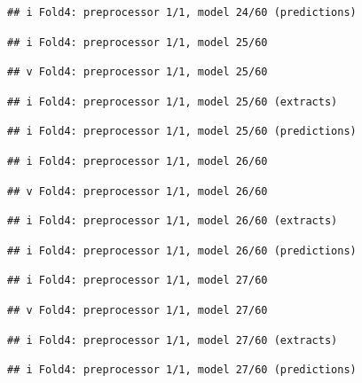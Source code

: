 \documentclass[
]{article}
\begin{document}
\begin{verbatim}
## i Fold4: preprocessor 1/1, model 24/60 (predictions)
\end{verbatim}

\begin{verbatim}
## i Fold4: preprocessor 1/1, model 25/60
\end{verbatim}

\begin{verbatim}
## v Fold4: preprocessor 1/1, model 25/60
\end{verbatim}

\begin{verbatim}
## i Fold4: preprocessor 1/1, model 25/60 (extracts)
\end{verbatim}

\begin{verbatim}
## i Fold4: preprocessor 1/1, model 25/60 (predictions)
\end{verbatim}

\begin{verbatim}
## i Fold4: preprocessor 1/1, model 26/60
\end{verbatim}

\begin{verbatim}
## v Fold4: preprocessor 1/1, model 26/60
\end{verbatim}

\begin{verbatim}
## i Fold4: preprocessor 1/1, model 26/60 (extracts)
\end{verbatim}

\begin{verbatim}
## i Fold4: preprocessor 1/1, model 26/60 (predictions)
\end{verbatim}

\begin{verbatim}
## i Fold4: preprocessor 1/1, model 27/60
\end{verbatim}

\begin{verbatim}
## v Fold4: preprocessor 1/1, model 27/60
\end{verbatim}

\begin{verbatim}
## i Fold4: preprocessor 1/1, model 27/60 (extracts)
\end{verbatim}

\begin{verbatim}
## i Fold4: preprocessor 1/1, model 27/60 (predictions)
\end{verbatim}
\end{document}
